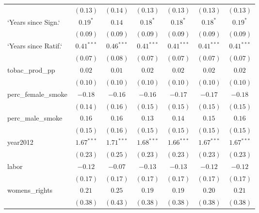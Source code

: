 \begin{table}[!h]
\begin{center}
\begin{tabular}{l c c c c c c }
                        & $(0.13)$     & $(0.14)$     & $(0.13)$     & $(0.13)$     & $(0.13)$     & $(0.13)$     \\
`Years since Sign.`     & $0.19^{*}$   & $0.14$       & $0.18^{*}$   & $0.18^{*}$   & $0.18^{*}$   & $0.19^{*}$   \\
                        & $(0.09)$     & $(0.09)$     & $(0.09)$     & $(0.09)$     & $(0.09)$     & $(0.09)$     \\
`Years since Ratif.`    & $0.41^{***}$ & $0.46^{***}$ & $0.41^{***}$ & $0.41^{***}$ & $0.41^{***}$ & $0.41^{***}$ \\
                        & $(0.07)$     & $(0.08)$     & $(0.07)$     & $(0.07)$     & $(0.07)$     & $(0.07)$     \\
tobac\_prod\_pp         & $0.02$       & $0.01$       & $0.02$       & $0.02$       & $0.02$       & $0.02$       \\
                        & $(0.10)$     & $(0.10)$     & $(0.10)$     & $(0.10)$     & $(0.10)$     & $(0.10)$     \\
perc\_female\_smoke     & $-0.18$      & $-0.16$      & $-0.16$      & $-0.17$      & $-0.17$      & $-0.18$      \\
                        & $(0.14)$     & $(0.16)$     & $(0.15)$     & $(0.15)$     & $(0.15)$     & $(0.15)$     \\
perc\_male\_smoke       & $0.16$       & $0.16$       & $0.13$       & $0.14$       & $0.15$       & $0.16$       \\
                        & $(0.15)$     & $(0.16)$     & $(0.15)$     & $(0.15)$     & $(0.15)$     & $(0.15)$     \\
year2012                & $1.67^{***}$ & $1.71^{***}$ & $1.68^{***}$ & $1.66^{***}$ & $1.67^{***}$ & $1.67^{***}$ \\
                        & $(0.23)$     & $(0.25)$     & $(0.23)$     & $(0.23)$     & $(0.23)$     & $(0.23)$     \\
labor                   & $-0.12$      & $-0.07$      & $-0.13$      & $-0.13$      & $-0.12$      & $-0.12$      \\
                        & $(0.17)$     & $(0.17)$     & $(0.17)$     & $(0.17)$     & $(0.17)$     & $(0.17)$     \\
womens\_rights          & $0.21$       & $0.25$       & $0.19$       & $0.19$       & $0.20$       & $0.21$       \\
                        & $(0.38)$     & $(0.43)$     & $(0.38)$     & $(0.38)$     & $(0.38)$     & $(0.38)$     \\

\end{tabular}
\end{center}
\end{table}
